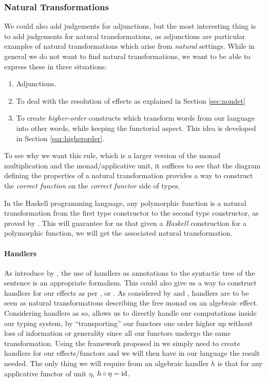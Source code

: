 \subsubsection{Natural Transformations}
\label{subsubsec:transnat}
We could also add judgements for adjunctions, but the most interesting thing is
to add judgements for natural transformations, as adjunctions are particular
examples of natural transformations which arise from \emph{natural} settings.
While in general we do not want to find natural transformations, we want to be
able to express these in three situations:
\begin{enumerate}
	\item Adjunctions.
	\item To deal with the resolution of effects as explained in Section
	      \ref{sec:nondet}
	\item To create \emph{higher-order} constructs which transform words from our
	      language into other words, while keeping the functorial aspect.
	      This idea is developed in Section \ref{par:higherorder}.
\end{enumerate}
To see why we want this rule, which is a larger version of the monad
multiplication and the monad/applicative unit, it suffices to see that the
diagram defining the properties of a natural transformation provides a way
to construct the \emph{correct function} on the \emph{correct functor} side of
types.

\smallskip

In the Haskell programming language, any polymorphic function is
a natural transformation from the first type constructor to the second type
constructor, as proved by \cite{wadlerTheoremsFree1989}.
This will guarantee for us that given a \emph{Haskell} construction for a
polymorphic function, we will get the associated natural transformation.

\paragraph{Handlers}
\label{par:handlers}
As introduce by \cite{marsikAlgebraicEffectsHandlers}, the use of handlers
as annotations to the syntactic tree of the sentence is an appropriate
formalism.
This could also give us a way to construct handlers for our effects as per
\cite{bauerEffectSystemAlgebraic2014}, or
\cite{plotkinHandlingAlgebraicEffects2013}.
As considered by \cite{wuEffectHandlersScope2014} and
\cite{vandenbergFrameworkHigherorderEffects2024}, handlers are to be seen
as natural transformations describing the free monad on an algebraic effect.
Considering handlers as so, allows us to directly handle our computations
inside our typing system, by ``transporting'' our functors one order higher up
without loss of information or generality since all our functors undergo the
same transformation.
Using the framework proposed in \cite{vandenbergFrameworkHigherorderEffects2024}
we simply need to create handlers for our effects/functors and we will then
have in our language the result needed.
The only thing we will require from an algebraic handler $h$ is that for any
applicative functor of unit $\eta$, $h\circ \eta = \mathrm{id}$.

